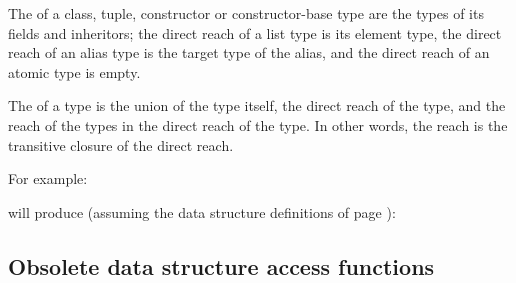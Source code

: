 \begin{desctab}
The  of a class, tuple, constructor
or constructor-base type are the types of its fields and inheritors;
the direct reach of a list type is its element type, the direct reach
of an alias type is the target type of the alias, and the direct reach
of an atomic type is empty.

The  of a type is the union of the type itself, the direct
reach of the type, and the reach of the types in the direct reach of
the type.  In other words, the reach is the transitive closure of the
direct reach.
\\
\end{desctab}
For example:
\begin{showfile}

\end{showfile}
will produce (assuming the data structure definitions of page \pageref{plotds}):
\begin{showfile}

\end{showfile}
\subsection{Obsolete data structure access functions}

